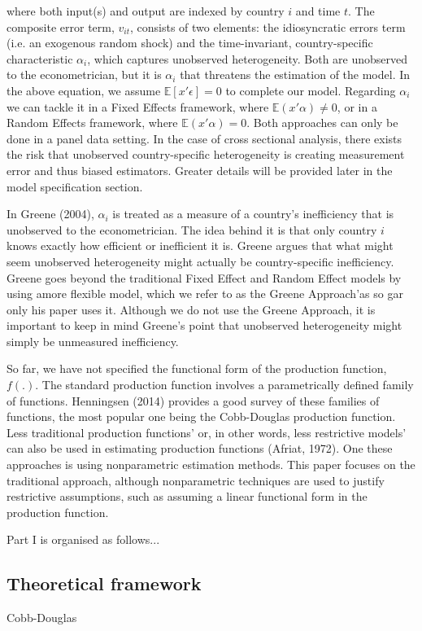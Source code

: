 \documentclass[12pt,a4paper]{article}\usepackage[]{graphicx}\usepackage[]{color}
\begin{document}
where both input(s) and output are indexed by country $i$ and time $t$. The composite error term, $v_{it}$, consists of two elements: the idiosyncratic errors term (i.e. an exogenous random shock) and the time-invariant, country-specific characteristic $\alpha_i$, which captures unobserved heterogeneity. Both are unobserved to the econometrician, but it is $\alpha_i$ that threatens the estimation of the model. In the above equation, we assume $\mathbb{E}[x' \epsilon]=0$ to complete our model. Regarding $\alpha_i$ we can tackle it in a Fixed Effects framework, where $\mathbb{E}(x' \alpha) \neq 0$, or in a Random Effects framework, where $\mathbb{E}(x' \alpha) = 0$. Both approaches can only be done in a panel data setting. In the case of cross sectional analysis, there exists the risk that unobserved country-specific heterogeneity is creating measurement error and thus biased estimators. Greater details will be provided later in the model specification section. 

In Greene (2004), $\alpha_i$ is treated as a measure of a country's inefficiency that is unobserved to the econometrician. The idea behind it is that only country $i$ knows exactly how efficient or inefficient it is. Greene argues that what might seem unobserved heterogeneity might actually be country-specific inefficiency. Greene goes beyond the traditional Fixed Effect and Random Effect models by using amore flexible model, which we refer to as the Greene Approach'as so gar only his paper uses it. Although we do not use the Greene Approach, it is important to keep in mind Greene's point that unobserved heterogeneity might simply be unmeasured inefficiency.

So far, we have not specified the functional form of the production function, $f(.)$. The standard production function involves a parametrically defined family of functions. Henningsen (2014) provides a good survey of these families of functions, the most popular one being the Cobb-Douglas production function. Less traditional production functions' or, in other words, less restrictive models' can also be used in estimating production functions (Afriat, 1972). One these approaches is using nonparametric estimation methods. This paper focuses on the traditional approach, although nonparametric techniques are used to justify restrictive assumptions, such as assuming a linear functional form in the production function.

Part I is organised as follows...


\subsection{Theoretical framework}
Cobb-Douglas
\end{document}
